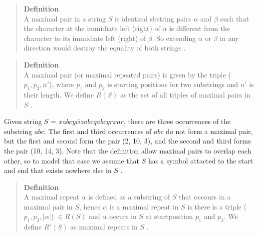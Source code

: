 \documentclass[12pt]{article} %
\begin{document}
\begin{quote}
\textbf{Definition} \\
A maximal pair in a string $S$ is identical sbstring pairs $\alpha$ and $\beta$ such that the character at the immidiate left (right) of $\alpha$ is different from the character to its immidiate left (right) of $\beta$. So extending $\alpha$ or $\beta$ in any direction would destroy the equality of both strings \cite{gusfield}. 
\end{quote}

\begin{quote}
\textbf{Definition} \\
A maximal pair (or maximal repeated pairs) is given by the triple ($p_1, p_2, n'$), where $p_1$ and $p_2$ is starting positions for two substrings and $n'$ is their length. We define $R(S)$ as the set of all triples of maximal pairs in $S$ \cite{gusfield}.
\end{quote}

Given string $S$ = $xabcyiizabcqabcyrxar$, there are three occurrences of the substring $abc$. The first and third occurrences of $abc$ do not form a maximal pair, but the first and second form the pair (2, 10, 3), and the second and third forms the pair (10, 14, 3). Note that the definition allow maximal pairs to overlap each other, so to model that case we assume that $S$ has a symbol attacted to the start and end that exists nowhere else in $S$ \cite{gusfield}.


\begin{quote}
\textbf{Definition} \\
A maximal repeat $\alpha$ is defined as a substring of $S$ that occours in a maximal pair in $S$, hence $\alpha$ is a maximal repeat in $S$ is there is a triple ($p_1, p_2, |\alpha|$) $ \in R(S)$  and $\alpha$ occurs in $S$ at startposition $p_1$ and $p_2$. We define $R'(S)$ as maximal repeats in $S$ \cite{gusfield}.
\end{quote}
\end{document}

